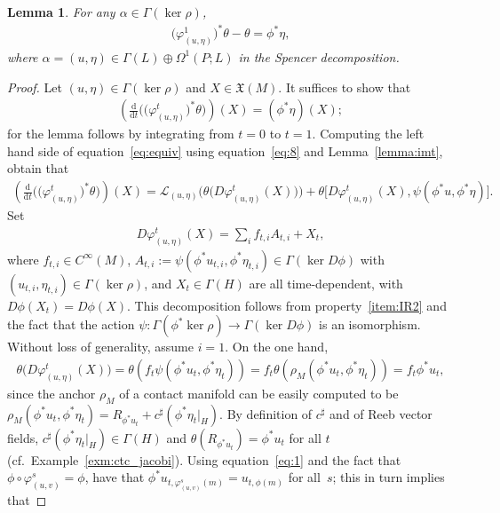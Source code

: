 \documentclass[10pt,a4paper]{amsart}
\numberwithin{equation}{section}
\newtheorem{Lemma}[Theorem]{Lemma}
\newcommand{\X}{\ensuremath{\mathfrak{X}}}
\newcommand{\de}{\mathrm{d}} %
\begin{document}
\begin{Lemma}\label{lemma:fundamental}
 For any $\alpha \in \Gamma(\ker \rho)$,
 \begin{gather*}
 \big(\varphi^1_{(u,\eta)}\big)^*\theta - \theta = \phi^*\eta,
 \end{gather*}
where $\alpha = (u, \eta) \in \Gamma(L) \oplus \Omega^1(P;L)$ in the Spencer decomposition.
\end{Lemma}

\begin{proof}
Let $(u,\eta) \in \Gamma(\ker \rho)$ and $X\in\X(M)$. It suf\/f\/ices to show that
 \begin{gather}\label{eq:equiv}
 \left( \frac{\de}{\de t} \big(\big(\varphi^t_{(u,\eta)}\big)^* \theta\big)\right)(X) = (\phi^*\eta)(X);
 \end{gather}
for the lemma follows by integrating from $t=0$ to $t=1$. Computing the left hand side of equation~\eqref{eq:equiv} using equation~\eqref{eq:8} and Lemma~\ref{lemma:imt}, obtain that
 \begin{gather} \label{eq:9}
 \left(\frac{\de}{\de t} \big(\big(\varphi^t_{(u,\eta)}\big)^* \theta\big)\right)(X)=
 \mathcal{L}_{(u,\eta)}\big(\theta\big(D \varphi^t_{(u,\eta)}(X)\big)\big) + \theta\big[D \varphi^t_{(u,\eta)}(X),\psi(\phi^* u, \phi^*\eta)\big].
 \end{gather}
Set
 \begin{gather}\label{eq:11} D\varphi^t_{(u,\eta)}(X) = \sum\limits_i f_{t,i} A_{t,i} + X_t, \end{gather}
where $f_{t,i} \in C^{\infty}(M)$, $A_{t,i} := \psi(\phi^*u_{t,i},\phi^*\eta_{t,i}) \in \Gamma(\ker D\phi)$ with $(u_{t,i},\eta_{t,i})\in\Gamma(\ker\rho)$, and $X_t \in \Gamma(H)$ are all time-dependent, with $D\phi(X_t) = D\phi(X)$. This decomposition follows from property~\ref{item:IR2} and the fact that the action $\psi \colon \Gamma(\phi^* \ker \rho) \to \Gamma(\ker D\phi)$ is an isomorphism. Without loss of generality, assume $i=1$. On the one hand,
 \begin{gather}\label{eq:1}
 \theta\big(D\varphi^t_{(u,\eta)}(X)\big) = \theta ( f_{t}\psi(\phi^*u_{t},\phi^* \eta_{t})) =f_t\theta(\rho_M(\phi^*u_{t}, \phi^* \eta_{t}))=
 f_{t} \phi^*u_{t},
 \end{gather}
since the anchor $\rho_M$ of a contact manifold can be easily computed to be $ \rho_M(\phi^*u_{t}, \phi^* \eta_{t}) = R_{\phi^*u_{t}} + c^{\sharp}(\phi^* \eta_{t}\rvert_H)$. By def\/inition of $c^{\sharp}$ and of Reeb vector f\/ields, $c^{\sharp}( \phi^* \eta_{t}\rvert_H) \in \Gamma(H)$ and $\theta(R_{\phi^*u_{t}})=\phi^*u_{t}$ for all $t$ (cf.\ Example~\ref{exm:ctc_jacobi}). Using equation~\eqref{eq:1} and the fact that $\phi\circ\varphi^s_{(u,v)}=\phi$, have that $\phi^*u_{t,\varphi^s_{(u,v)}(m)}=u_{t,\phi(m)}$ for all~$s$; this in turn implies that

\end{proof}
\end{document}
